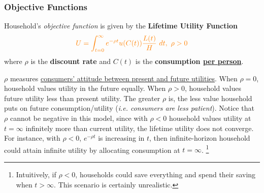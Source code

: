 \documentclass[11pt]{article}
\begin{document}
	\subsubsection{Objective Functions}
	\par Household's \emph{objective function} is given by the \textbf{Lifetime Utility Function}
	\begin{equation}
		\textcolor{orange}{
			U = \int_{t=0}^\infty {e^{-\rho t} u(C(t)) \frac{L(t)}{H}}\ dt,\ \rho > 0
		}
	\end{equation}
	where $\rho$ is the \textbf{discount rate} and $C(t)$ is the \textbf{consumption \ul{per person}}.
	\begin{remark}
		$\rho$ measures \ul{consumers' attitude between present and future utilities}.
		When $\rho = 0$, household values utility in the future equally. 
		When $\rho > 0$, household values future utility less than present utility.
		The greater $\rho$ is, the less value household puts on future consumption/utility (\emph{i.e. consumers are less patient}).
		Notice that $\rho$ cannot be negative in this model, since with $\rho < 0$ household values utility at $t=\infty$ infinitely more than current utility, the lifetime utility does not converge. For instance, with $\rho < 0$, $e^{-\rho t}$ is increasing in $t$, then infinite-horizon household could attain infinite utility by allocating consumption at $t=\infty$.
		\footnote{Intuitively, if $\rho < 0$, households could save everything and spend their saving when $t > \infty$. This scenario is certainly unrealistic.}
	\end{remark}
	
\end{document}
